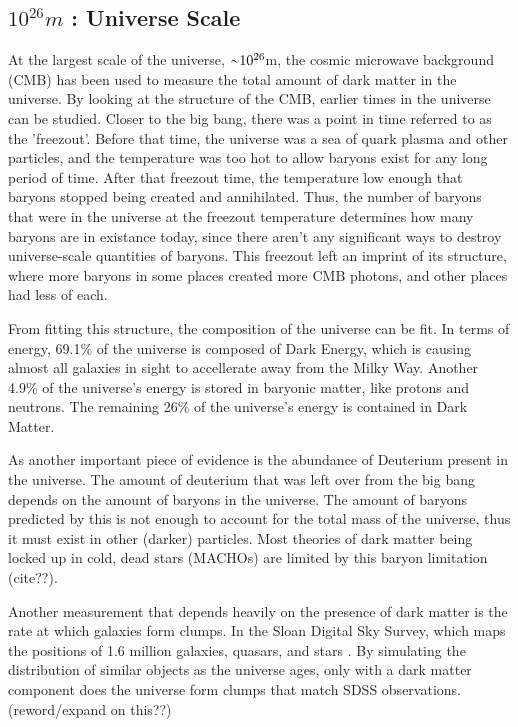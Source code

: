 \subsection{$10^{26}m$ : Universe Scale}
%
At the largest scale of the universe, $\nicetilde 10^{26}$m, the cosmic microwave background (CMB) has been used to measure the total amount of dark matter in the universe.
By looking at the structure of the CMB, earlier times in the universe can be studied.
Closer to the big bang, there was a point in time referred to as the 'freezout'.
Before that time, the universe was a sea of quark plasma and other particles, and the temperature was too hot to allow baryons exist for any long period of time.
After that freezout time, the temperature low enough that baryons stopped being created and annihilated.
Thus, the number of baryons that were in the universe at the freezout temperature determines how many baryons are in existance today, since there aren't any significant ways to destroy universe-scale quantities of baryons.
This freezout left an imprint of its structure, where more baryons in some places created more CMB photons, and other places had less of each.

From fitting this structure, the composition of the universe can be fit.
In terms of energy, 69.1\% of the universe is composed of Dark Energy, which is causing almost all galaxies in sight to accellerate away from the Milky Way.
Another 4.9\% of the universe's energy is stored in baryonic matter, like protons and neutrons.
The remaining 26\% of the universe's energy is contained in Dark Matter\cite{planck2015}.

As another important piece of evidence is the abundance of Deuterium present in the universe.
The amount of deuterium that was left over from the big bang depends on the amount of baryons in the universe.
The amount of baryons predicted by this is not enough to account for the total mass of the universe, thus it must exist in other (darker) particles.
Most theories of dark matter being locked up in cold, dead stars (MACHOs) are limited by this baryon limitation (cite??).

Another measurement that depends heavily on the presence of dark matter is the rate at which galaxies form clumps.
In the Sloan Digital Sky Survey, which maps the positions of 1.6 million galaxies, quasars, and stars \cite{sdss_release}.
By simulating the distribution of similar objects as the universe ages, only with a dark matter component does the universe form clumps that match SDSS observations.
(reword/expand on this??)


